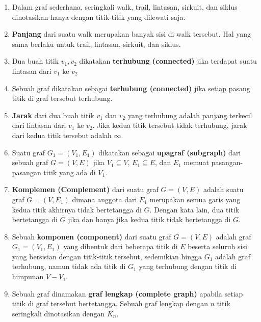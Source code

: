 \documentclass[11pt]{scrartcl}
\begin{document}
\begin{enumerate}
    \item Dalam graf sederhana, seringkali walk, trail, lintasan, sirkuit, dan siklus dinotasikan hanya dengan titik-titik yang dilewati saja.
    \item \textbf{Panjang} dari suatu walk merupakan banyak sisi di walk tersebut. Hal yang sama berlaku untuk trail, lintasan, sirkuit, dan siklus.
    \item Dua buah titik $v_1, v_2$ dikatakan \textbf{terhubung (connected)} jika terdapat suatu lintasan dari $v_1$ ke $v_2$
    \item Sebuah graf dikatakan sebagai \textbf{terhubung (connected)} jika setiap pasang titik di graf tersebut terhubung.
    \item \textbf{Jarak} dari dua buah titik $v_1$ dan $v_2$ yang terhubung adalah panjang terkecil dari lintasan dari $v_1$ ke $v_2$. Jika kedua titik tersebut tidak terhubung, jarak dari kedua titik tersebut adalah $\infty$.
    \item Suatu graf $G_1 = (V_1, E_1)$ dikatakan sebagai \textbf{upagraf (subgraph)} dari sebuah graf $G = (V, E)$ jika $V_1 \subseteq V$, $E_1 \subseteq E$, dan $E_1$ memuat pasangan-pasangan titik yang ada di $V_1$.
    \item \textbf{Komplemen (Complement)} dari suatu graf $G = (V, E)$ adalah suatu graf $\overline{G} = (V, E_1)$ dimana anggota dari $E_1$ merupakan semua garis yang kedua titik akhirnya tidak bertetangga di $G$. Dengan kata lain, dua titik bertetangga di $\overline{G}$ jika dan hanya jika kedua titik tidak bertetangga di $G$.
    \item Sebuah \textbf{komponen (component)} dari suatu graf $G = (V, E)$ adalah graf $G_1 = (V_1, E_1)$ yang dibentuk dari beberapa titik di $E$ beserta seluruh sisi yang bersisian dengan titik-titik tersebut, sedemikian hingga $G_1$ adalah graf terhubung, namun tidak ada titik di $G_1$ yang terhubung dengan titik di himpunan $V - V_1$.
    \item Sebuah graf dinamakan \textbf{graf lengkap (complete graph)} apabila setiap titik di graf tersebut bertetangga. Sebuah graf lengkap dengan $n$ titik seringkali dinotasikan dengan $K_n$. 
\end{enumerate}
\end{document}
